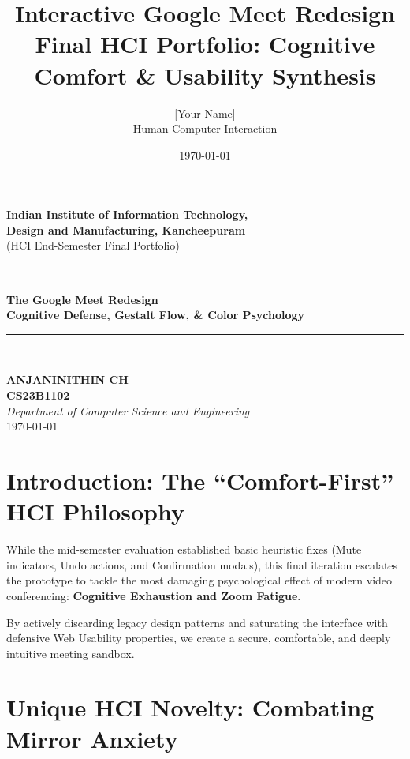 \documentclass[12pt,a4paper]{article}
\title{\textbf{Interactive Google Meet Redesign}\\
\large Final HCI Portfolio: Cognitive Comfort \& Usability Synthesis}
\author{[Your Name]\\Human-Computer Interaction}
\date{\today}
\begin{document}
\begin{titlepage}
\begin{center}

{\LARGE \textbf{Indian Institute of Information Technology,\\
Design and Manufacturing, Kancheepuram}}\\[1.5cm]

{\large (HCI End-Semester Final Portfolio)}\\[3cm]

\rule{\linewidth}{0.5pt}\\[0.4cm]
{\Huge \textbf{The Google Meet Redesign}}\\[0.3cm]
{\Large \textbf{Cognitive Defense, Gestalt Flow, \& Color Psychology}}\\[0.3cm]
\rule{\linewidth}{0.5pt}\\[2cm]

\vfill

\textbf{ANJANINITHIN CH}\\[0.2cm]
\textbf{CS23B1102}\\[0.2cm]
\textit{Department of Computer Science and Engineering}\\[0.5cm]

{\large \today}

\end{center}
\end{titlepage}

\newpage
\tableofcontents
\newpage

\section{Introduction: The ``Comfort-First'' HCI Philosophy}

While the mid-semester evaluation established basic heuristic fixes (Mute indicators, Undo actions, and Confirmation modals), this final iteration escalates the prototype to tackle the most damaging psychological effect of modern video conferencing: \textbf{Cognitive Exhaustion and Zoom Fatigue}.

By actively discarding legacy design patterns and saturating the interface with defensive Web Usability properties, we create a secure, comfortable, and deeply intuitive meeting sandbox.

\section{Unique HCI Novelty: Combating Mirror Anxiety}
\end{document}
